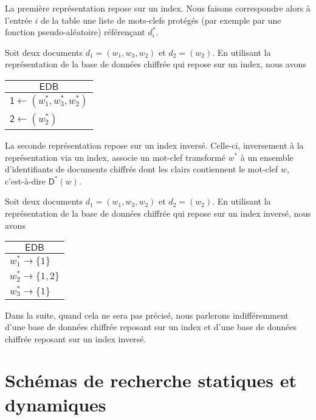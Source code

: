 La première représentation repose sur un index. Nous faisons correspondre alors
à l'entrée $i$ de la table une liste de mots-clefs protégés (par exemple par une
fonction pseudo-aléatoire) référençant $d_i^*$.

\begin{exmp}
Soit deux documents $d_1=(w_1,w_3,w_2)$ et $d_2=(w_2)$. En utilisant la
représentation de la base de données chiffrée qui repose sur un index, nous
avons
\begin{center}
\begin{tabular}{l}
\multicolumn{1}{c}{$\mathsf{EDB}$} \\
\hline
$\mathsf{1} \leftarrow (w_1^*,w_3^*,w_2^*)$ \\
$\mathsf{2} \leftarrow (w_2^*)$
\end{tabular}
\end{center}
\end{exmp}

La seconde représentation repose sur un index inversé. Celle-ci, inversement à
la représentation via un index, associe un mot-clef transformé $w^*$ à un
ensemble d'identifiants de documents chiffrés dont les clairs contiennent le
mot-clef $w$, c'est-à-dire $\mathsf{D}^*(w)$.

\begin{exmp}
Soit deux documents $d_1=(w_1,w_3,w_2)$ et $d_2=(w_2)$. En utilisant la
représentation de la base de données chiffrée qui repose sur un index inversé,
nous avons
\begin{center}
\begin{tabular}{l}
\multicolumn{1}{c}{$\mathsf{EDB}$} \\
\hline
$w_1^* \rightarrow \{1\}$ \\
$w_2^* \rightarrow \{1,2\}$ \\
$w_3^* \rightarrow \{1\}$
\end{tabular}
\end{center}
\end{exmp}

\begin{remark}
Dans la suite, quand cela ne sera pas précisé, nous parlerons indifféremment
d'une base de données chiffrée reposant sur un index et d'une base de données
chiffrée reposant sur un index inversé.
\end{remark}

\section{Schémas de recherche statiques et dynamiques}


